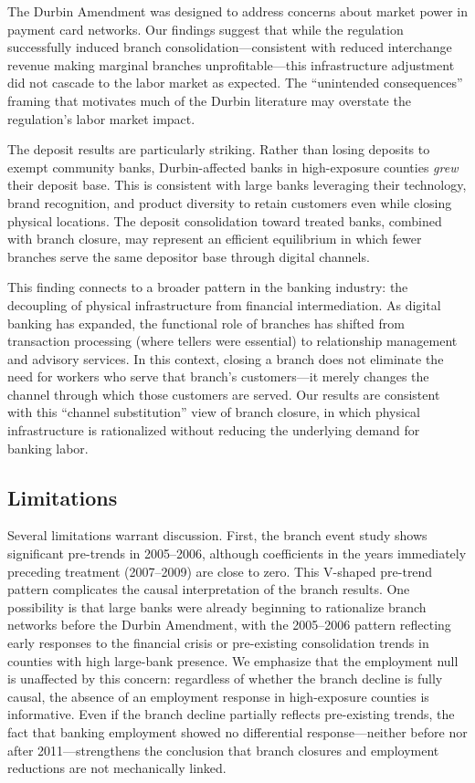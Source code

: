 \documentclass[12pt]{article}
\begin{document}
The Durbin Amendment was designed to address concerns about market power in payment card networks. Our findings suggest that while the regulation successfully induced branch consolidation---consistent with reduced interchange revenue making marginal branches unprofitable---this infrastructure adjustment did not cascade to the labor market as expected. The ``unintended consequences'' framing that motivates much of the Durbin literature may overstate the regulation's labor market impact.

The deposit results are particularly striking. Rather than losing deposits to exempt community banks, Durbin-affected banks in high-exposure counties \textit{grew} their deposit base. This is consistent with large banks leveraging their technology, brand recognition, and product diversity to retain customers even while closing physical locations. The deposit consolidation toward treated banks, combined with branch closure, may represent an efficient equilibrium in which fewer branches serve the same depositor base through digital channels.

This finding connects to a broader pattern in the banking industry: the decoupling of physical infrastructure from financial intermediation. As digital banking has expanded, the functional role of branches has shifted from transaction processing (where tellers were essential) to relationship management and advisory services. In this context, closing a branch does not eliminate the need for workers who serve that branch's customers---it merely changes the channel through which those customers are served. Our results are consistent with this ``channel substitution'' view of branch closure, in which physical infrastructure is rationalized without reducing the underlying demand for banking labor.

\subsection{Limitations}

Several limitations warrant discussion. First, the branch event study shows significant pre-trends in 2005--2006, although coefficients in the years immediately preceding treatment (2007--2009) are close to zero. This V-shaped pre-trend pattern complicates the causal interpretation of the branch results. One possibility is that large banks were already beginning to rationalize branch networks before the Durbin Amendment, with the 2005--2006 pattern reflecting early responses to the financial crisis or pre-existing consolidation trends in counties with high large-bank presence. We emphasize that the employment null is unaffected by this concern: regardless of whether the branch decline is fully causal, the absence of an employment response in high-exposure counties is informative. Even if the branch decline partially reflects pre-existing trends, the fact that banking employment showed no differential response---neither before nor after 2011---strengthens the conclusion that branch closures and employment reductions are not mechanically linked.
\end{document}

